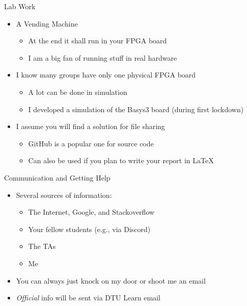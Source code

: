 \begin{frame}[fragile]{Lab Work}
\begin{itemize}
\item A Vending Machine
\begin{itemize}
\item At the end it shall run in your FPGA board
\item I am a big fan of running stuff in real hardware
\end{itemize}
\item I know many groups have only one physical FPGA board
\begin{itemize}
\item A lot can be done in simulation
\item I developed a simulation of the Basys3 board (during first lockdown)
\end{itemize}
\item I assume you will find a solution for file sharing
\begin{itemize}
\item GitHub is a popular one for source code
\item Can also be used if you plan to write your report in LaTeX
\end{itemize}
\end{itemize}
\end{frame}



\begin{frame}[fragile]{Communication and Getting Help}
\begin{itemize}
\item Several sources of information:
\begin{itemize}
\item The Internet, Google, and Stackoverflow
\item Your fellow students (e.g., via Discord)
\item The TAs
\item Me
\end{itemize}
\item You can always just knock on my door or shoot me an email
\item \emph{Official} info will be sent via DTU Learn email
\end{itemize}
\end{frame}

